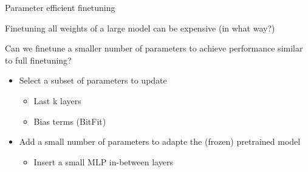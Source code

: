 \documentclass[usenames,dvipsnames,notes,11pt,aspectratio=169,hyperref={colorlinks=true, linkcolor=blue}]{beamer}
\begin{document}
\begin{frame}
    {Parameter efficient finetuning}

    Finetuning all weights of a large model can be expensive (in what way?)

    \pause
    Can we finetune a smaller number of parameters to achieve performance similar to full finetuning?\\
    \begin{itemize}
        \item Select a subset of parameters to update 
            \begin{itemize}
                \item Last k layers  
                \item Bias terms (BitFit) 
            \end{itemize}
        \item Add a small number of parameters to adapte the (frozen) pretrained model
            \begin{itemize}
                \item Insert a small MLP in-between layers 
            \end{itemize}
    \end{itemize}
\end{frame}
\end{document}
